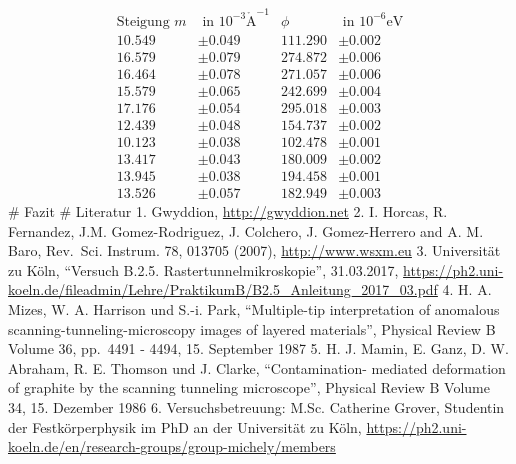 \documentclass[12pt,a4paper]{scrartcl}
\numberwithin{equation}{section} %
\renewcommand{\[}{} %
\renewcommand{\]}{\noindent} %
\begin{document}
\[
\begin{align*}
    \text{Steigung } m &\text{ in } 10^{-3}\mathrm{\mathring A}^{-1}
        & \phi &\text{ in } 10^{-6}\mathrm{eV} \\
    10.549 &\pm 0.049 & 111.290 &\pm 0.002 \\
    16.579 &\pm 0.079 & 274.872 &\pm 0.006 \\
    16.464 &\pm 0.078 & 271.057 &\pm 0.006 \\
    15.579 &\pm 0.065 & 242.699 &\pm 0.004 \\
    17.176 &\pm 0.054 & 295.018 &\pm 0.003 \\
    12.439 &\pm 0.048 & 154.737 &\pm 0.002 \\
    10.123 &\pm 0.038 & 102.478 &\pm 0.001 \\
    13.417 &\pm 0.043 & 180.009 &\pm 0.002 \\
    13.945 &\pm 0.038 & 194.458 &\pm 0.001 \\
    13.526 &\pm 0.057 & 182.949 &\pm 0.003 
\end{align*}
\] \# Fazit \# Literatur 1. Gwyddion, \url{http://gwyddion.net} 2. I.
Horcas, R. Fernandez, J.M. Gomez-Rodriguez, J. Colchero, J.
Gomez-Herrero and A. M. Baro, Rev.~Sci. Instrum. 78, 013705 (2007),
\url{http://www.wsxm.eu} 3. Universität zu Köln, ``Versuch B.2.5.
Rastertunnelmikroskopie'', 31.03.2017,
\url{https://ph2.uni-koeln.de/fileadmin/Lehre/PraktikumB/B2.5_Anleitung_2017_03.pdf}
4. H. A. Mizes, W. A. Harrison und S.-i. Park, ``Multiple-tip
interpretation of anomalous scanning-tunneling-microscopy images of
layered materials'', Physical Review B Volume 36, pp.~4491 - 4494, 15.
September 1987 5. H. J. Mamin, E. Ganz, D. W. Abraham, R. E. Thomson und
J. Clarke, ``Contamination- mediated deformation of graphite by the
scanning tunneling microscope'', Physical Review B Volume 34, 15.
Dezember 1986 6. Versuchsbetreuung: M.Sc. Catherine Grover, Studentin
der Festkörperphysik im PhD an der Universität zu Köln,
\url{https://ph2.uni-koeln.de/en/research-groups/group-michely/members}
\end{document}
